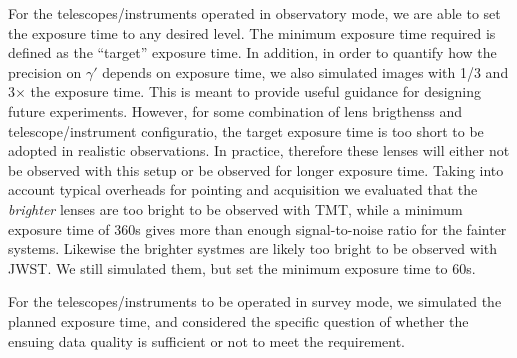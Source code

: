\documentclass[a4paper,11pt]{article}
\begin{document}
For the telescopes/instruments operated in observatory mode, we are
able to set the exposure time to any desired level. The minimum
exposure time required is defined as the ``target'' exposure time. In
addition, in order to quantify how the precision on $\gamma'$ depends
on exposure time, we also simulated images with 1/3 and 3$\times$ the
exposure time. This is meant to provide useful guidance for designing
future experiments. However, for some combination of lens brigthenss
and telescope/instrument configuratio, the target exposure time is too
short to be adopted in realistic observations. In practice, therefore
these lenses will either not be observed with this setup or be
observed for longer exposure time. Taking into account typical
overheads for pointing and acquisition we evaluated that the {\it
brighter} lenses are too bright to be observed with TMT, while a
minimum exposure time of 360s gives more than enough signal-to-noise
ratio for the fainter systems. Likewise the brighter systmes are
likely too bright to be observed with JWST. We still simulated them,
but set the minimum exposure time to 60s.

For the telescopes/instruments to be operated in survey mode, we
simulated the planned exposure time, and considered the specific
question of whether the ensuing data quality is sufficient or not to
meet the requirement.
\end{document}
